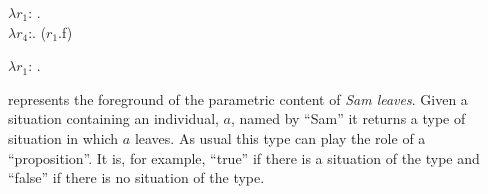 \begin{ex}
\begin{subex}
\item $\lambda
  r_1$: . \\
\hspace*{2em}$\lambda r_4$:.
($r_1$.f)

\item $\lambda
  r_1$: . \\
\hspace*{2em}
 
 
\end{subex} 
\label{ex:paramcontSamLeft}   
\end{ex} 
\preveg{} represents the foreground of the parametric content of \textit{Sam leaves}.
Given a situation containing an individual, $a$, named by ``Sam'' it
returns a type of situation in which $a$ leaves.  As usual this type
can play the role of a ``proposition''.  It  is, for example, ``true''
if there is a situation of the type and ``false'' if there is no
situation of the type.  

